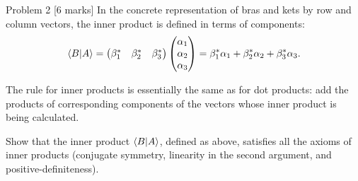 \documentclass[12pt]{article}
\begin{document}
\newpage
\begin{problembox}{Problem 2 \hfill [6 marks]}
In the concrete representation of bras and kets by row and column vectors, the inner product is defined in terms of components:
\[
\braket{B|A}
=
\begin{pmatrix}
\beta_1^* & \beta_2^* & \beta_3^*
\end{pmatrix}
\begin{pmatrix}
\alpha_1\\
\alpha_2\\
\alpha_3
\end{pmatrix}
=\beta_1^*\alpha_1+\beta_2^*\alpha_2+\beta_3^*\alpha_3.
\]

The rule for inner products is essentially the same as for dot products: add the products of corresponding components of the vectors whose inner product is being calculated.

Show that the inner product $\braket{B|A}$, defined as above, satisfies all the axioms of inner products (conjugate symmetry, linearity in the second argument, and positive-definiteness).
\end{problembox}
\end{document}
